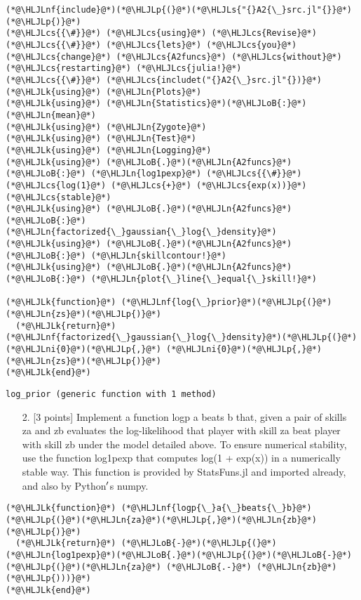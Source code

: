 \documentclass[12pt,a4paper]{article}
\newcommand{\HLJLk}[1]{\textcolor[RGB]{148,91,176}{\textbf{#1}}}
\newcommand{\HLJLn}[1]{#1}
\newcommand{\HLJLnf}[1]{\textcolor[RGB]{66,102,213}{#1}}
\newcommand{\HLJLs}[1]{\textcolor[RGB]{201,61,57}{#1}}
\newcommand{\HLJLni}[1]{\textcolor[RGB]{59,151,46}{#1}}
\newcommand{\HLJLoB}[1]{\textcolor[RGB]{102,102,102}{\textbf{#1}}}
\newcommand{\HLJLp}[1]{#1}
\newcommand{\HLJLcs}[1]{\textcolor[RGB]{153,153,119}{\textit{#1}}}
\begin{document}
\begin{lstlisting}
(*@\HLJLnf{include}@*)(*@\HLJLp{(}@*)(*@\HLJLs{"{}A2{\_}src.jl"{}}@*)(*@\HLJLp{)}@*)
(*@\HLJLcs{{\#}}@*) (*@\HLJLcs{using}@*) (*@\HLJLcs{Revise}@*) (*@\HLJLcs{{\#}}@*) (*@\HLJLcs{lets}@*) (*@\HLJLcs{you}@*) (*@\HLJLcs{change}@*) (*@\HLJLcs{A2funcs}@*) (*@\HLJLcs{without}@*) (*@\HLJLcs{restarting}@*) (*@\HLJLcs{julia!}@*)
(*@\HLJLcs{{\#}}@*) (*@\HLJLcs{includet("{}A2{\_}src.jl"{})}@*)
(*@\HLJLk{using}@*) (*@\HLJLn{Plots}@*)
(*@\HLJLk{using}@*) (*@\HLJLn{Statistics}@*)(*@\HLJLoB{:}@*) (*@\HLJLn{mean}@*)
(*@\HLJLk{using}@*) (*@\HLJLn{Zygote}@*)
(*@\HLJLk{using}@*) (*@\HLJLn{Test}@*)
(*@\HLJLk{using}@*) (*@\HLJLn{Logging}@*)
(*@\HLJLk{using}@*) (*@\HLJLoB{.}@*)(*@\HLJLn{A2funcs}@*)(*@\HLJLoB{:}@*) (*@\HLJLn{log1pexp}@*) (*@\HLJLcs{{\#}}@*) (*@\HLJLcs{log(1}@*) (*@\HLJLcs{+}@*) (*@\HLJLcs{exp(x))}@*) (*@\HLJLcs{stable}@*)
(*@\HLJLk{using}@*) (*@\HLJLoB{.}@*)(*@\HLJLn{A2funcs}@*)(*@\HLJLoB{:}@*) (*@\HLJLn{factorized{\_}gaussian{\_}log{\_}density}@*)
(*@\HLJLk{using}@*) (*@\HLJLoB{.}@*)(*@\HLJLn{A2funcs}@*)(*@\HLJLoB{:}@*) (*@\HLJLn{skillcontour!}@*)
(*@\HLJLk{using}@*) (*@\HLJLoB{.}@*)(*@\HLJLn{A2funcs}@*)(*@\HLJLoB{:}@*) (*@\HLJLn{plot{\_}line{\_}equal{\_}skill!}@*)

(*@\HLJLk{function}@*) (*@\HLJLnf{log{\_}prior}@*)(*@\HLJLp{(}@*)(*@\HLJLn{zs}@*)(*@\HLJLp{)}@*)
  (*@\HLJLk{return}@*) (*@\HLJLnf{factorized{\_}gaussian{\_}log{\_}density}@*)(*@\HLJLp{(}@*)(*@\HLJLni{0}@*)(*@\HLJLp{,}@*) (*@\HLJLni{0}@*)(*@\HLJLp{,}@*) (*@\HLJLn{zs}@*)(*@\HLJLp{)}@*)
(*@\HLJLk{end}@*)
\end{lstlisting}

\begin{lstlisting}
log_prior (generic function with 1 method)
\end{lstlisting}


\begin{itemize}
\item[2. ] [3 points] Implement a function logp a beats b that, given a pair of skills za and zb evaluates the log-likelihood that player with skill za beat player with skill zb under the model detailed above. To ensure numerical stability, use the function log1pexp that computes log(1 + exp(x)) in a numerically stable way. This function is provided by StatsFuns.jl and imported already, and also by Python\ensuremath{\rq}s numpy.

\end{itemize}

\begin{lstlisting}
(*@\HLJLk{function}@*) (*@\HLJLnf{logp{\_}a{\_}beats{\_}b}@*)(*@\HLJLp{(}@*)(*@\HLJLn{za}@*)(*@\HLJLp{,}@*)(*@\HLJLn{zb}@*)(*@\HLJLp{)}@*)
  (*@\HLJLk{return}@*) (*@\HLJLoB{-}@*)(*@\HLJLp{(}@*)(*@\HLJLn{log1pexp}@*)(*@\HLJLoB{.}@*)(*@\HLJLp{(}@*)(*@\HLJLoB{-}@*)(*@\HLJLp{(}@*)(*@\HLJLn{za}@*) (*@\HLJLoB{.-}@*) (*@\HLJLn{zb}@*)(*@\HLJLp{)))}@*)
(*@\HLJLk{end}@*)
\end{lstlisting}
\end{document}
